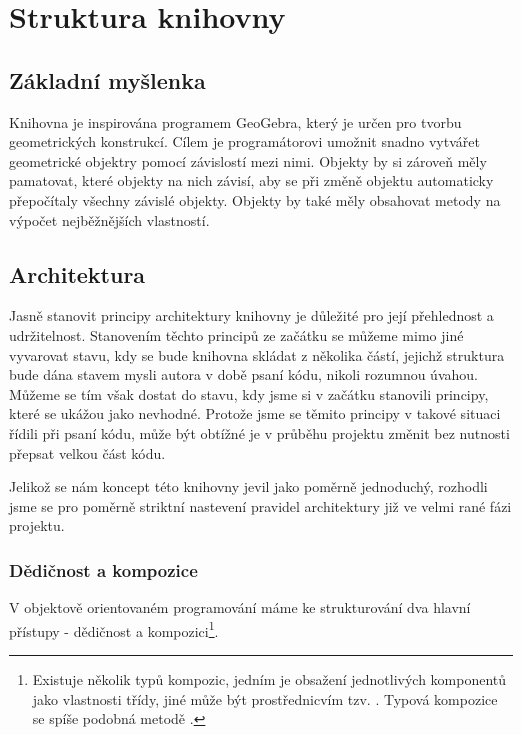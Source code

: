 \chapter{Struktura knihovny}
\label{chap:strucutre}

\section{Základní myšlenka}
\label{sec:basic-idea}

Knihovna je inspirována programem GeoGebra, který je určen pro tvorbu geometrických konstrukcí. 
Cílem je programátorovi umožnit snadno vytvářet geometrické objektry pomocí závislostí mezi nimi.
Objekty by si zároveň měly pamatovat, které objekty na nich závisí, aby se při změně objektu automaticky přepočítaly všechny závislé objekty.
Objekty by také měly obsahovat metody na výpočet nejběžnějších vlastností.

\section{Architektura}
\label{sec:architecture}

Jasně stanovit principy architektury knihovny je důležité pro její přehlednost a udržitelnost.
Stanovením těchto principů ze začátku se můžeme mimo jiné vyvarovat stavu, kdy se bude knihovna skládat z několika částí, jejichž struktura bude dána stavem mysli autora v době psaní kódu, nikoli rozumnou úvahou.
Můžeme se tím však dostat do stavu, kdy jsme si v začátku stanovili principy, které se ukážou jako nevhodné. 
Protože jsme se těmito principy v takové situaci řídili při psaní kódu, může být obtížné je v průběhu projektu změnit bez nutnosti přepsat velkou část kódu.

Jelikož se nám koncept této knihovny jevil jako poměrně jednoduchý, rozhodli jsme se pro poměrně striktní nastevení pravidel architektury již ve velmi rané fázi projektu\cite{geometryjs:wiki:code-structure}.

\subsection{Dědičnost a kompozice}
\label{subsec:inheritance-composition}

V objektově orientovaném programování máme ke strukturování dva hlavní přístupy - dědičnost\cite{wikipedia:inheritance} a kompozici\footnote{Existuje několik typů kompozic, jedním je obsažení jednotlivých komponentů jako vlastnosti třídy, jiné může být prostřednicvím tzv. \cite{Rust:traits}. Typová kompozice se spíše podobná metodě . }.

